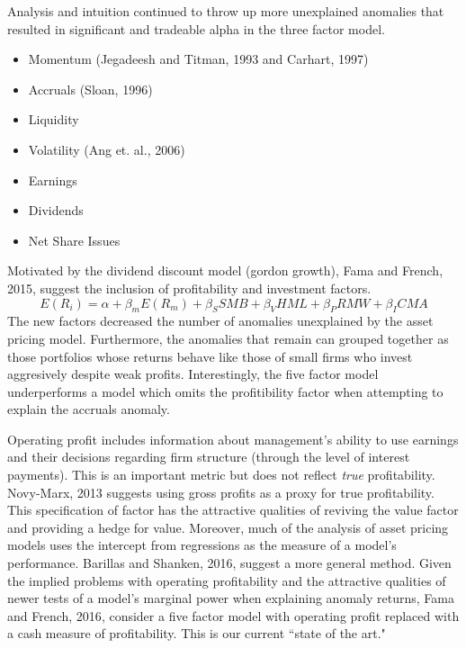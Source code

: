 Analysis and intuition continued to throw up more unexplained anomalies that resulted in
significant and tradeable alpha in the three factor model.
\begin{itemize}
  \item Momentum (Jegadeesh and Titman, 1993\cite{jegadeesh1993returns} and
  Carhart, 1997\cite{carhart1997persistence})
  \item Accruals (Sloan, 1996\cite{sloan1996stock})
  \item Liquidity
  \item Volatility (Ang et. al., 2006\cite{ang2006cross})
  \item Earnings
  \item Dividends
  \item Net Share Issues
\end{itemize}

Motivated by the dividend discount model (gordon growth), Fama and French,
2015\cite{fama2015five}, suggest the inclusion of profitability and investment factors.
\begin{equation}
  E(R_i) = \alpha + \beta_mE(R_m) + \beta_SSMB + \beta_VHML + \beta_PRMW + \beta_ICMA
\end{equation}
The new factors decreased the number of anomalies unexplained by the asset pricing model.
Furthermore, the anomalies that remain can grouped together as those portfolios whose
returns behave like those of small firms who invest aggresively despite weak profits.
Interestingly, the five factor model underperforms a model which omits the profitibility
factor when attempting to explain the accruals anomaly.

Operating profit includes information about management's ability to use earnings and their
decisions regarding firm structure (through the level of interest payments). This is an
important metric but does not reflect \emph{true} profitability. Novy-Marx,
2013\cite{novy2013other} suggests using gross profits as a proxy for true profitability.
This specification of factor has the attractive qualities of reviving the value factor and
providing a hedge for value. Moreover, much of the analysis of asset pricing models uses
the intercept from regressions as the measure of a model's performance. Barillas and
Shanken, 2016\cite{barillas2016alpha}, suggest a more general method. Given the implied
problems with operating profitability and the attractive qualities of newer tests of a
model's marginal power when explaining anomaly returns, Fama and French,
2016\cite{fama2016dissecting}, consider a five factor model with operating profit replaced
with a cash measure of profitability. This is our current ``state of the art."
